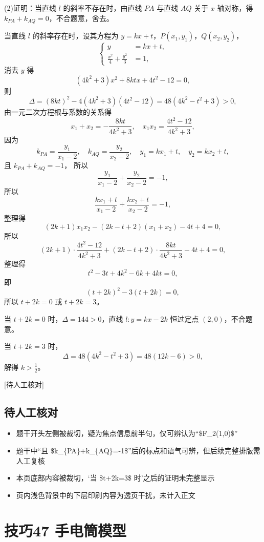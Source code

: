 \documentclass[UTF8,a4paper,11pt]{ctexart}
\begin{document}
(2)证明：当直线 $l$ 的斜率不存在时，由直线 $PA$ 与直线 $AQ$ 关于 $x$ 轴对称，得 $k_{PA}+k_{AQ}=0$，不合题意，舍去。

当直线 $l$ 的斜率存在时，设其方程为 $y=kx+t$，$P(x_1,y_1)$，$Q(x_2,y_2)$，
\[
\left\{\begin{aligned}
y&=kx+t,\\
\frac{x^2}{4}+\frac{y^2}{3}&=1,
\end{aligned}\right.
\]
消去 $y$ 得
\[
(4k^2+3)x^2+8ktx+4t^2-12=0,
\]
则
\[
\Delta=(8kt)^2-4(4k^2+3)(4t^2-12)=48(4k^2-t^2+3)>0,
\]
由一元二次方程根与系数的关系得
\[
x_1+x_2=-\frac{8kt}{4k^2+3},\quad x_1x_2=\frac{4t^2-12}{4k^2+3},
\]
因为
\[
k_{PA}=\frac{y_1}{x_1-2},\quad k_{AQ}=\frac{y_2}{x_2-2},\quad y_1=kx_1+t,\quad y_2=kx_2+t,
\]
且 $k_{PA}+k_{AQ}=-1$，
所以
\[
\frac{y_1}{x_1-2}+\frac{y_2}{x_2-2}=-1,
\]
所以
\[
\frac{kx_1+t}{x_1-2}+\frac{kx_2+t}{x_2-2}=-1,
\]
整理得
\[
(2k+1)x_1x_2-(2k-t+2)(x_1+x_2)-4t+4=0,
\]
所以
\[
(2k+1)\cdot \frac{4t^2-12}{4k^2+3}+(2k-t+2)\cdot \frac{8kt}{4k^2+3}-4t+4=0,
\]
整理得
\[
t^2-3t+4k^2-6k+4kt=0,
\]
即
\[
(t+2k)^2-3(t+2k)=0,
\]
所以 $t+2k=0$ 或 $t+2k=3$。

当 $t+2k=0$ 时，$\Delta=144>0$，直线 $l:y=kx-2k$ 恒过定点 $(2,0)$，不合题意。

当 $t+2k=3$ 时，
\[
\Delta=48(4k^2-t^2+3)=48(12k-6)>0,
\]
解得 $k>\frac{1}{2}$。

[待人工核对]

\subsection*{待人工核对}

\begin{itemize}

\item 题干开头左侧被裁切，疑为焦点信息前半句，仅可辨认为“\$F\_2(1,0)\$”

\item 题干中“且 \$k\_\{PA\}+k\_\{AQ\}=-1\$”后的标点和语气可辨，但后续完整排版需人工复核

\item 本页底部内容被裁切，‘当 \$t+2k=3\$ 时’之后的证明未完整显示

\item 页内浅色背景中的下层印刷内容为透页干扰，未计入正文

\end{itemize}

\clearpage

\section{技巧47 手电筒模型}
\end{document}
